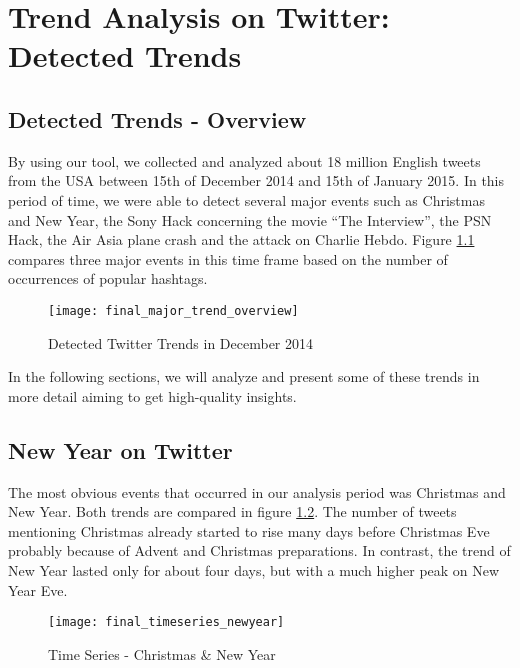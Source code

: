 \chapter{Trend Analysis on Twitter: Detected Trends}
\label{cha:trend-stories}

\section{Detected Trends - Overview}
\label{sec:trend-overview}

By using our tool, we collected and analyzed about 18 million English tweets from the USA between 15th of December 2014 and 15th of January 2015. In this period of time, we were able to detect several major events such as Christmas and New Year, the Sony Hack concerning the movie \enquote{The Interview}, the PSN Hack, the Air Asia plane crash and the attack on Charlie Hebdo. Figure \ref{fig:major-trend-overview} compares three major events in this time frame based on the number of occurrences of popular hashtags. 

\begin{figure}[H]
  \centering
        \texttt{[image: final\_major\_trend\_overview]}
  \caption[Detected Twitter Trends in December 2014]{Detected Twitter Trends in December 2014}
  \label{fig:major-trend-overview}
\end{figure}

In the following sections, we will analyze and present some of these trends in more detail aiming to get high-quality insights. 

\section{New Year on Twitter}
\label{sec:happy-new-year}
The most obvious events that occurred in our analysis period was Christmas and New Year. Both trends are compared in figure \ref{fig:christmas-new-year-time-series}. The number of tweets mentioning Christmas already started to rise many days before Christmas Eve probably because of Advent and Christmas preparations. In contrast, the trend of New Year lasted only for about four days, but with a much higher peak on New Year Eve.

\begin{figure}[H]
  \centering
        \texttt{[image: final\_timeseries\_newyear]}
  \caption[Time Series - Christmas \& New Year ]{Time Series - Christmas \& New Year}
  \label{fig:christmas-new-year-time-series}
  \vspace{-1.3em}
\end{figure}

